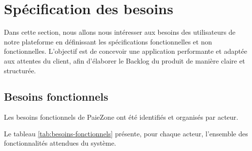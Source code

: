 \section{Spécification des besoins}\label{sec:besoins}

Dans cette section, nous allons nous intéresser aux besoins des utilisateurs de notre plateforme en définissant les spécifications fonctionnelles et non fonctionnelles. L'objectif est de concevoir une application performante et adaptée aux attentes du client, afin d'élaborer le Backlog du produit de manière claire et structurée.

\subsection{Besoins fonctionnels}

Les besoins fonctionnels de PaieZone ont été identifiés et organisés par acteur.

Le tableau \ref{tab:besoins-fonctionnels} présente, pour chaque acteur, l'ensemble des fonctionnalités attendues du système.

\renewcommand{\arraystretch}{1.8}

